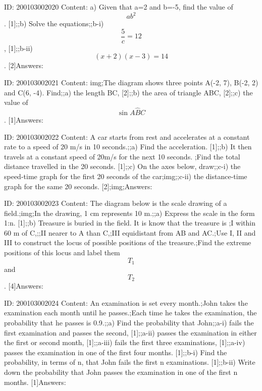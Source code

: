 \documentclass{article}
\begin{document}
ID: 200103002020
Content:
a) Given that a=2 and b=-5, find the value of $$ab^2$$.    [1];;b) Solve the equations;;b-i) $$\frac{5}{c} = 12$$,    [1];;b-ii) $$(x + 2)(x - 3) = 14$$.    [2]Answers:

ID: 200103002021
Content:
img;The diagram shows three points A(-2, 7), B(-2, 2) and C(6, -4). Find;;a) the length BC,    [2];;b) the area of triangle ABC,    [2];;c) the value of $$\sin A \hat BC$$.    [1]Answers:

ID: 200103002022
Content:
A car starts from rest and accelerates at a constant rate to a speed of 20 m/s in 10 seconds.;;a) Find the acceleration.    [1];;b) It then travels at a constant speed of 20m/s for the next 10 seconds. ;Find the total distance travelled in the 20 seconds.    [1];;c) On the axes below, draw;;c-i) the speed-time graph for the first 20 seconds of the car;img;;c-ii) the distance-time graph for the same 20 seconds.    [2];img;Answers:

ID: 200103002023
Content:
The diagram below is the scale drawing of a field.;img;In the drawing, 1 cm represents 10 m.;;a) Express the scale in the form 1:n.    [1];;b) Treasure is buried in the field. It is know that the treasure is ;I	within 60 m of C,;;II	nearer to A than C,;III	equidistant from AB and AC.;Use I, II and III to construct the locus of possible positions of the treasure.;Find the extreme positions of this locus and label them $$T_1$$ and $$T_2$$.    [4]Answers:

ID: 200103002024
Content:
An examination is set every month.;John takes the examination each month until he passes.;Each time he takes the examination, the probability that he passes is 0.9.;;a) Find the probability that John;;a-i) fails the first examination and passes the second,    [1];;a-ii) passes the examination in either the first or second month,    [1];;a-iii) fails the first three examinations,    [1];;a-iv) passes the examination in one of the first four months.    [1];;b-i) Find the probability, in terms of n, that John fails the first n examinations.    [1];;b-ii) Write down the probability that John passes the examination in one of the first n months.    [1]Answers:
\end{document}
